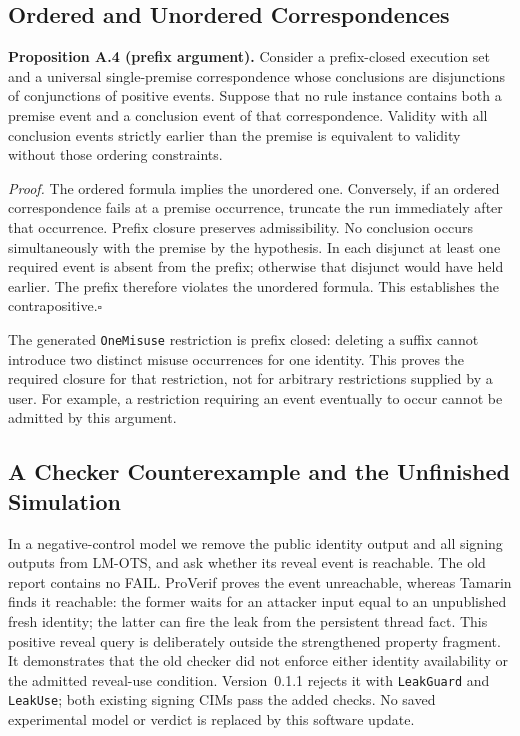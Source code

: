 \subsection{Ordered and Unordered Correspondences}

\noindent\textbf{Proposition A.4 (prefix argument).}
Consider a prefix-closed execution set and a universal single-premise
correspondence whose conclusions are disjunctions of conjunctions of
positive events. Suppose that no rule instance contains both a premise
event and a conclusion event of that correspondence. Validity with all
conclusion events strictly earlier than the premise is equivalent to
validity without those ordering constraints.

\emph{Proof.} The ordered formula implies the unordered one. Conversely,
if an ordered correspondence fails at a premise occurrence, truncate the
run immediately after that occurrence. Prefix closure preserves
admissibility. No conclusion occurs simultaneously with the premise by
the hypothesis. In each disjunct at least one required event is absent
from the prefix; otherwise that disjunct would have held earlier. The
prefix therefore violates the unordered formula. This establishes the
contrapositive.\hfill$\square$

The generated \texttt{OneMisuse} restriction is prefix closed: deleting
a suffix cannot introduce two distinct misuse occurrences for one
identity. This proves the required closure for that restriction, not
for arbitrary restrictions supplied by a user. For example, a
restriction requiring an event eventually to occur cannot be admitted
by this argument.

\subsection{A Checker Counterexample and the Unfinished Simulation}

In a negative-control model we remove the public identity output and
all signing outputs from LM-OTS, and ask whether its reveal event is
reachable. The old report contains no FAIL. ProVerif proves the event
unreachable, whereas Tamarin finds it reachable: the former waits for
an attacker input equal to an unpublished fresh identity; the latter
can fire the leak from the persistent thread fact. This positive reveal
query is deliberately outside the strengthened property fragment. It
demonstrates that the old checker did not enforce either identity
availability or the admitted reveal-use condition. Version~0.1.1 rejects
it with \texttt{LeakGuard} and \texttt{LeakUse}; both existing signing
CIMs pass the added checks. No saved experimental model or verdict is
replaced by this software update.

